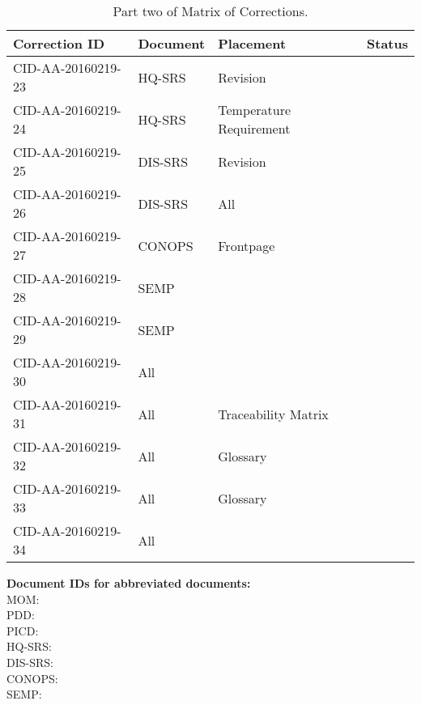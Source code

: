 \begin{table}[ht]
\centering
\begin{tabular}{|>{\centering\arraybackslash}p{4.5cm}|>{\centering\arraybackslash}p{2cm}|>{\centering\arraybackslash}p{3cm}|>{\centering\arraybackslash}p{3cm}|}
\hline \textbf{Correction ID} & \textbf{Document} & \textbf{Placement} & \textbf{Status} \\ 
\hline CID-AA-20160219-23 & HQ-SRS & Revision & \\ 
\hline CID-AA-20160219-24 & HQ-SRS & Temperature Requirement & \\ 
\hline CID-AA-20160219-25 & DIS-SRS & Revision & \\ 
\hline CID-AA-20160219-26 & DIS-SRS & All & \\ 
\hline CID-AA-20160219-27 & CONOPS & Frontpage & \\ 
\hline CID-AA-20160219-28 & SEMP &  & \\ 
\hline CID-AA-20160219-29 & SEMP &  & \\ 
\hline CID-AA-20160219-30 & All &  & \\ 
\hline CID-AA-20160219-31 & All & Traceability Matrix & \\ 
\hline CID-AA-20160219-32 & All & Glossary & \\ 
\hline CID-AA-20160219-33 & All & Glossary & \\ 
\hline CID-AA-20160219-34 & All &  & \\
\hline 
\end{tabular}
\caption{Part two of Matrix of Corrections.}
\label{tb:MoC2} 
\end{table}

\vspace{20pt}
\noindent \textbf{Document IDs for abbreviated documents:}\\
MOM:        \mom \\
PDD:        \pdd \\
PICD:       \picd \\
HQ-SRS:     \srshq \\
DIS-SRS:    \srsdis \\
CONOPS:     \conops \\
SEMP:       \semp \\

